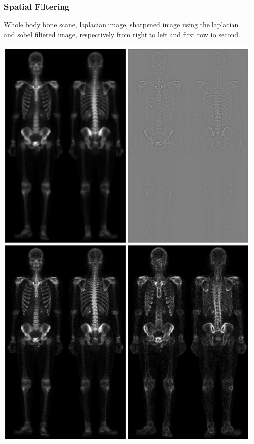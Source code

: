 \documentclass{beamer}
\begin{document}
\begin{frame}
\frametitle{Spatial Filtering}
Whole body bone scane, laplacian image, sharpened image using the laplacian and sobel filtered image, respectively from right to left and first row to second. 
\begin{center}
\includegraphics[scale=0.13]{images/Spatial12-ex1.png}
\end{center}
\end{frame}

\end{document}
